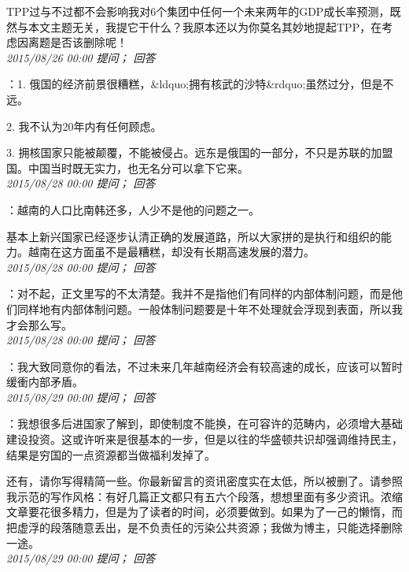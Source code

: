 \documentclass[twocolumn]{ctexart}
\begin{document}
TPP过与不过都不会影响我对6个集团中任何一个未来两年的GDP成长率预测，既然与本文主题无关，我提它干什么？我原本还以为你莫名其妙地提起TPP，在考虑因离题是否该删除呢！\\

\textit{\hfill\noindent\small 2015/08/26 00:00 提问； 回答}

：1. 俄国的经济前景很糟糕，\&ldquo;拥有核武的沙特\&rdquo;虽然过分，但是不远。

2. 我不认为20年内有任何顾虑。

3. 拥核国家只能被颠覆，不能被侵占。远东是俄国的一部分，不只是苏联的加盟国。中国当时既无实力，也无名分可以拿下它来。\\

\textit{\hfill\noindent\small 2015/08/28 00:00 提问； 回答}

：越南的人口比南韩还多，人少不是他的问题之一。

基本上新兴国家已经逐步认清正确的发展道路，所以大家拼的是执行和组织的能力。越南在这方面虽不是最糟糕，却没有长期高速发展的潜力。\\

\textit{\hfill\noindent\small 2015/08/28 00:00 提问； 回答}

：对不起，正文里写的不太清楚。我并不是指他们有同样的内部体制问题，而是他们同样地有内部体制问题。一般体制问题要是十年不处理就会浮现到表面，所以我才会那么写。\\

\textit{\hfill\noindent\small 2015/08/28 00:00 提问； 回答}

：我大致同意你的看法，不过未来几年越南经济会有较高速的成长，应该可以暂时缓衝内部矛盾。\\

\textit{\hfill\noindent\small 2015/08/29 00:00 提问； 回答}

：我想很多后进国家了解到，即使制度不能换，在可容许的范畴内，必须增大基础建设投资。这或许听来是很基本的一步，但是以往的华盛顿共识却强调维持民主，结果是穷国的一点资源都当做福利发掉了。

还有，请你写得精简一些。你最新留言的资讯密度实在太低，所以被删了。请参照我示范的写作风格：有好几篇正文都只有五六个段落，想想里面有多少资讯。浓缩文章要花很多精力，但是为了读者的时间，必须要做到。如果为了一己的懒惰，而把虚浮的段落随意丢出，是不负责任的污染公共资源；我做为博主，只能选择删除一途。\\

\textit{\hfill\noindent\small 2015/08/29 00:00 提问； 回答}
\end{document}
